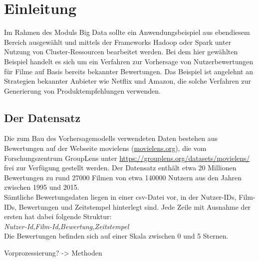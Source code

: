 \chapter{Einleitung}

Im Rahmen des Moduls Big Data sollte ein Anwendungsbeispiel aus ebendiesem Bereich ausgewählt und mittels der Frameworks Hadoop oder Spark unter Nutzung von Cluster-Ressourcen bearbeitet werden. Bei dem hier gewählten Beispiel handelt es sich um ein Verfahren zur Vorhersage von Nutzerbewertungen für Filme auf Basis bereits bekannter Bewertungen. Das Beispiel ist angelehnt an Strategien bekannter Anbieter wie Netflix und Amazon, die solche Verfahren zur Generierung von Produktempfehlungen verwenden.


\section{Der Datensatz}

Die zum Bau des Vorhersagemodells verwendeten Daten bestehen aus Bewertungen auf der Webseite movielens (\url{movielens.org}), die vom Forschungszentrum GroupLens unter \url{https://grouplens.org/datasets/movielens/} frei zur Verfügung gestellt werden. Der Datensatz enthält etwa 20 Millionen Bewertungen zu rund 27000 Filmen von etwa 140000 Nutzern aus den Jahren zwischen 1995 und 2015. 
\\
Sämtliche Bewertungsdaten liegen in einer csv-Datei vor, in der Nutzer-IDs, Film-IDs, Bewertungen und Zeitstempel hinterlegt sind. Jede Zeile mit Ausnahme der ersten hat dabei folgende Struktur:
\\
\emph{Nutzer-Id,Film-Id,Bewertung,Zeitstempel}
\\
Die Bewertungen befinden sich auf einer Skala zwischen 0 und 5 Sternen.









Vorprozessierung? -> Methoden